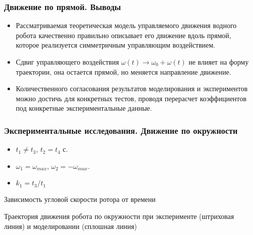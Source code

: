 %


\begin{frame}
\frametitle{Движение по прямой. Выводы}
	\begin{itemize}
		\item Рассматриваемая теоретическая модель управляемого движения водного робота качественно правильно  описывает его движение вдоль прямой, которое реализуется симметричным управляющим воздействием.
		\item Сдвиг управляющего воздействия $\omega(t) \rightarrow \omega_0 + \omega(t)$ не влияет на форму траектории, она остается прямой, но меняется направление движение.
		\item Количественного согласования результатов моделирования и экспериментов можно достичь для конкретных тестов, проводя перерасчет коэффициентов под конкретные экспериментальные данные.
	\end{itemize}
	
\end{frame}


\begin{frame}
\frametitle{Экспериментальные исследования. Движение по окружности}
	\begin{itemize}
		\item $t_1 \neq t_3$, $t_2 = t_4$ с.
		\item $ \omega_1 = \omega_{max} $, $ \omega_2 = -\omega_{max} $. 
		\item $ k_1 = t_3 / t_1 $
	\end{itemize}
		
	 \begin{minipage}[t]{0.47\linewidth}
		{Зависимость угловой скорости ротора от времени \\}
	\end{minipage}
	\hfill
	\begin{minipage}[t]{0.47\linewidth}
		{Траектория движения робота по окружности при эксперименте (штриховая линия) и моделировании (сплошная линия)}
	\end{minipage}

\end{frame}






